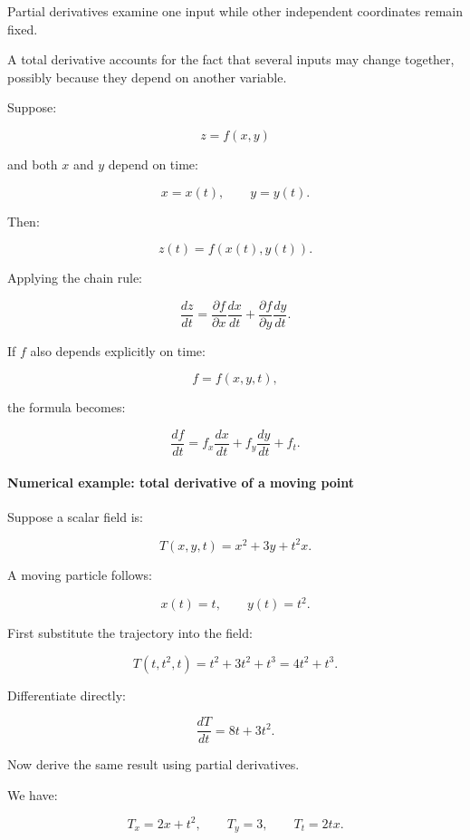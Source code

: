 \hypertarget{02-foundations-ii-ch021-the-total-derivative}{}

Partial derivatives examine one input while other independent coordinates remain fixed.

A total derivative accounts for the fact that several inputs may change together, possibly because they depend on another variable.

Suppose:

\[
z=f(x,y)
\]

and both \(x\) and \(y\) depend on time:

\[
x=x(t),\qquad y=y(t).
\]

Then:

\[
z(t)=f(x(t),y(t)).
\]

Applying the chain rule:

\[
\boxed{ \frac{dz}{dt} = \frac{\partial f}{\partial x}\frac{dx}{dt} + \frac{\partial f}{\partial y}\frac{dy}{dt} }.
\]

If \(f\) also depends explicitly on time:

\[
f=f(x,y,t),
\]

the formula becomes:

\[
\boxed{ \frac{df}{dt} = f_x\frac{dx}{dt} + f_y\frac{dy}{dt} + f_t }.
\]

\paragraph{Numerical example: total derivative of a moving point}\label{02-foundations-ii-ch021-numerical-example-total-derivative-of-a-moving-point}

\hypertarget{02-foundations-ii-ch021-numerical-example-total-derivative-of-a-moving-point}{}

Suppose a scalar field is:

\[
T(x,y,t)=x^2+3y+t^2x.
\]

A moving particle follows:

\[
x(t)=t,\qquad y(t)=t^2.
\]

First substitute the trajectory into the field:

\[
T(t,t^2,t)=t^2+3t^2+t^3=4t^2+t^3.
\]

Differentiate directly:

\[
\boxed{\frac{dT}{dt}=8t+3t^2}.
\]

Now derive the same result using partial derivatives.

We have:

\[
T_x=2x+t^2,\qquad T_y=3,\qquad T_t=2tx.
\]

